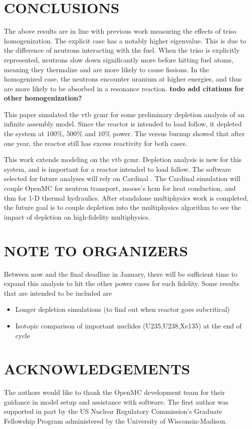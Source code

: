 \documentclass[letterpaper]{physor2024}
\begin{document}
\section{CONCLUSIONS}\label{sec:conclusions}
The above results are in line with previous work measuring the effects of \gls{triso} homogenization. The explicit case has a notably higher eigenvalue. This is due to the difference of neutrons interacting with the fuel. When the \gls{triso} is explicitly represented, neutrons slow down significantly more before hitting fuel atoms, meaning they thermalize and are more likely to cause fissions. In the homogenized case, the neutrons encounter uranium at higher energies, and thus are more likely to be absorbed in a resonance reaction. \textbf{todo add citations for other homogenization?}

This paper simulated the \gls{vtb} \gls{gcmr} for some preliminary depletion analysis of an infinite assembly model. Since the reactor is intended to load follow, it depleted the system at $100\%$, $500\%$ and $10\%$ power.
The \kinf versus burnup showed that after one year, the reactor still has excess reactivity for both cases.

This work extends modeling on the \gls{vtb} \gls{gcmr}. Depletion analysis is new for this system, and is important for a reactor intended to load follow. The software selected for future analyses will rely on Cardinal \cite{novak2022-cardinal}. The Cardinal simulation will couple OpenMC for neutron transport, \gls{moose}'s \gls{hcm} for heat conduction, and \gls{thm} for 1-D thermal hydraulics. After standalone multiphysics work is completed, the future goal is to couple depletion into the multiphysics algorithm to see the impact of depletion on high-fidelity multiphysics.

\section*{NOTE TO ORGANIZERS}
Between now and the final deadline in January, there will be sufficient time to expand this analysis to hit the other power cases for each fidelity. Some results that are intended to be included are
\begin{itemize}
    \item Longer depletion simulations (to find out when reactor goes subcritical)
    \item Isotopic comparison of important nuclides (U235,U238,Xe135) at the end of cycle
\end{itemize}

\section*{ACKNOWLEDGEMENTS}
The authors would like to thank the OpenMC development team for their guidance in model setup and assistance with software. The first author was supported in part by the US Nuclear Regulatory Commission's Graduate Fellowship Program administered by the University of Wisconsin-Madison.

\printglossaries



\end{document}
